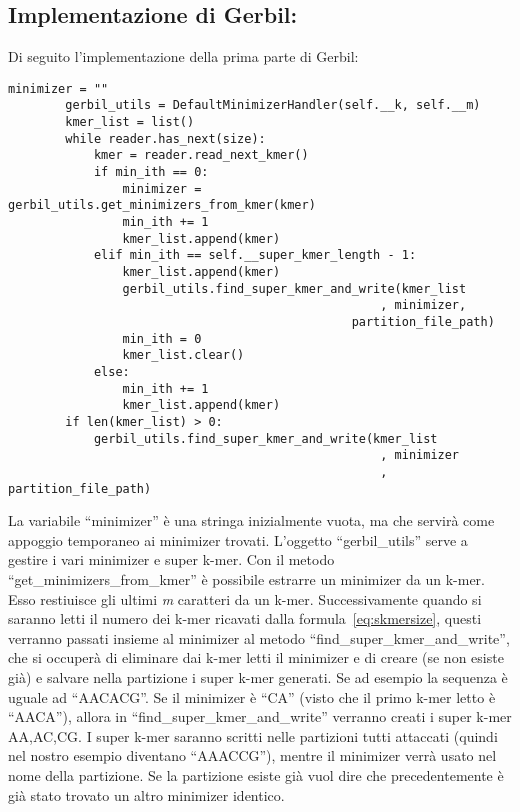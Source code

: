 \subsection{Implementazione di Gerbil:} \label{subsec:implementazione-di-gerbil:}
Di seguito l'implementazione della prima parte di Gerbil:
\begin{lstlisting}[label={lst:primapartegerbil}]
        minimizer = ""
        gerbil_utils = DefaultMinimizerHandler(self.__k, self.__m)
        kmer_list = list()
        while reader.has_next(size):
            kmer = reader.read_next_kmer()
            if min_ith == 0:
                minimizer = gerbil_utils.get_minimizers_from_kmer(kmer)
                min_ith += 1
                kmer_list.append(kmer)
            elif min_ith == self.__super_kmer_length - 1:
                kmer_list.append(kmer)
                gerbil_utils.find_super_kmer_and_write(kmer_list
                                                    , minimizer,
                                                partition_file_path)
                min_ith = 0
                kmer_list.clear()
            else:
                min_ith += 1
                kmer_list.append(kmer)
        if len(kmer_list) > 0:
            gerbil_utils.find_super_kmer_and_write(kmer_list
                                                    , minimizer
                                                    , partition_file_path)
\end{lstlisting}
La variabile ``minimizer'' \`e una stringa inizialmente vuota, ma che servir\`a come appoggio temporaneo ai minimizer trovati.
L'oggetto ``gerbil\_utils'' serve a gestire i vari minimizer e super k-mer.
Con il metodo ``get\_minimizers\_from\_kmer'' \`e possibile estrarre un minimizer da un k-mer.
Esso restiuisce gli ultimi \textit{m } caratteri da un k-mer.
Successivamente quando si saranno letti il numero dei k-mer ricavati dalla formula~\eqref{eq:skmersize}, questi verranno passati insieme al minimizer al metodo ``find\_super\_kmer\_and\_write'', che si occuper\`a di eliminare dai k-mer letti il minimizer e di creare (se non esiste gi\`a) e salvare nella partizione i super k-mer generati.
Se ad esempio la sequenza \`e uguale ad ``AACACG''.
Se il minimizer \`e ``CA'' (visto che il primo k-mer letto \`e ``AACA''), allora in ``find\_super\_kmer\_and\_write'' verranno creati i super k-mer AA,AC,CG.
I super k-mer saranno scritti nelle partizioni tutti attaccati (quindi nel nostro esempio diventano ``AAACCG''), mentre il minimizer verr\`a usato nel nome della
partizione.
Se la partizione esiste gi\`a vuol dire che precedentemente \`e gi\`a stato trovato un altro minimizer identico.
